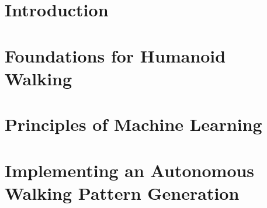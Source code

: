 \documentclass  [
paper    = a4,
BCOR     = 10mm,
twoside,
fontsize = 12pt,
toc      = bibnumbered,
toc      = listofnumbered,
numbers  = noendperiod,
headings = normal,
listof   = leveldown,
version  = 3.03
]                                       {scrreprt}
\begin{document}
	
	
	\tableofcontents
	
	\chapter{Introduction}
	
	
	\chapter{Foundations for Humanoid Walking}
	
	\chapter{Principles of Machine Learning}
	
	\chapter{Implementing an Autonomous Walking Pattern Generation}
	
	

	
	
\end{document}
